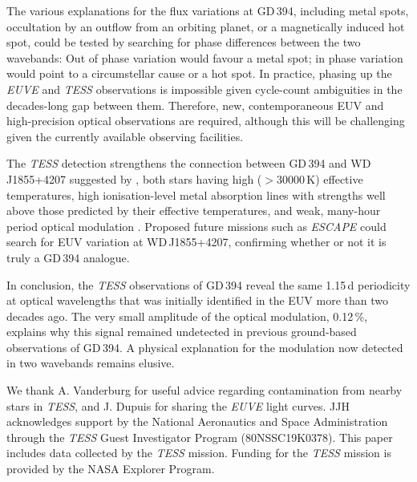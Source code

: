 \documentclass{aastex63}
\begin{document}

The various explanations for the flux variations at GD\,394, including metal spots, occultation by an outflow from an orbiting planet, or a magnetically induced hot spot,  could be tested by searching for phase differences between the two wavebands: Out of phase variation would favour a metal spot; in phase variation would point to a circumstellar cause or a hot spot. In practice, phasing up the {\em EUVE} and {\em TESS} observations is impossible given cycle-count ambiguities in the decades-long gap between them. Therefore, new, contemporaneous EUV and high-precision optical observations are required, although this will be challenging given the currently available observing facilities.

The \textit{TESS} detection strengthens the connection between GD\,394 and WD\,J1855+4207 suggested by \citet{hallakounetal18-1}, both stars having high ($> 30000$\,K) effective temperatures, high ionisation-level metal absorption lines with strengths well above those predicted by their effective temperatures, and weak, many-hour period optical modulation \citep{maozetal15-1}. Proposed future missions such as \textit{ESCAPE} \citep{franceetal19-1} could search for EUV variation at WD\,J1855+4207, confirming whether or not it is truly a GD\,394 analogue.


In conclusion, the \textit{TESS} observations of GD\,394 reveal the same 1.15\,d periodicity at optical wavelengths that was initially identified in the EUV more than two decades ago. The very small amplitude of the optical modulation, 0.12\,\%, explains why this signal remained undetected in previous ground-based observations of GD\,394. A physical explanation for the modulation now detected in two wavebands remains elusive.

\acknowledgments
We thank A. Vanderburg for useful advice regarding contamination from nearby stars in \textit{TESS}, and J. Dupuis for sharing the \textit{EUVE} light curves. JJH acknowledges support by the National Aeronautics and Space Administration through the \textit{TESS} Guest Investigator Program (80NSSC19K0378). This paper includes data collected by the \textit{TESS} mission. Funding for the \textit{TESS} mission is provided by the NASA Explorer Program.
\end{document}
